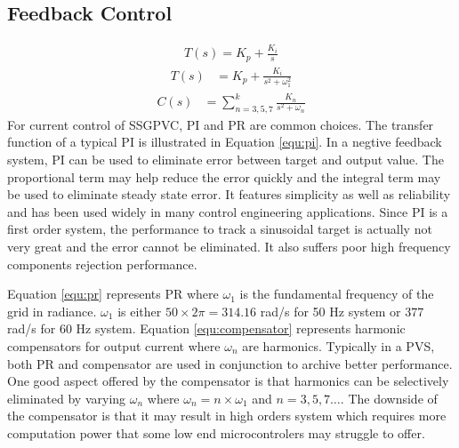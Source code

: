 \subsection{Feedback Control}
\begin{align}\label{equ:pi}
    T(s) = K_p + \frac{K_i}{s}
\end{align}
\begin{align}\label{equ:pr}
    T(s) &= K_p + \frac{K_i}{s^2 + \omega_1^2}
\end{align}
\begin{align}\label{equ:compensator}
    C(s) &= \sum\limits^{k}_{n=3, 5, 7}\frac{K_n}{s^2+\omega_n}
\end{align}
For current control of \gls{SSGPVC}, \gls{PI} and \gls{PR} are common choices. The transfer function of a typical \gls{PI} is illustrated in Equation \eqref{equ:pi}. In a negtive feedback system, \gls{PI} can be used to eliminate error between target and output value. The proportional term may help reduce the error quickly and the integral term may be used to eliminate steady state error. It features simplicity as well as reliability and has been used widely in many control engineering applications. Since \gls{PI} is a first order system, the performance to track a sinusoidal target is actually not very great and the error cannot be eliminated. It also suffers poor high frequency components rejection performance.

Equation \eqref{equ:pr} represents \gls{PR} where $\omega_1$ is the fundamental frequency of the grid in radiance. $\omega_1$ is either $50\times 2\pi=314.16$ rad/s for 50 Hz system or $377$ rad/s for 60 Hz system. Equation \eqref{equ:compensator} represents harmonic compensators for output current where $\omega_n$ are harmonics. Typically in a \gls{PVS}, both \gls{PR} and compensator are used in conjunction to archive better performance. One good aspect offered by the compensator is that harmonics can be selectively eliminated by varying $\omega_n$ where $\omega_n = n \times \omega_1$ and $n=3,5,7\dots$. The downside of the compensator is that it may result in high orders system which requires more computation power that some low end microcontrolers may struggle to offer. 

